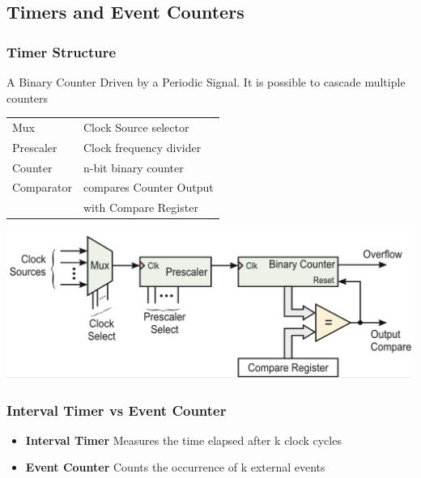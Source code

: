 \subsection{Timers and Event Counters }
\subsubsection{Timer Structure}
A Binary Counter Driven by a Periodic Signal. It is possible to cascade multiple counters\\
\vspace{1cm}
\begin{minipage}{0.5\linewidth}
	\begin{tabular}{ll}
		Mux           & Clock Source selector \\
		Prescaler     & Clock frequency divider \\
		Counter       & n-bit binary counter \\
		Comparator    & compares Counter Output\\
                      &  with Compare Register
	\end{tabular}
\end{minipage}
\begin{minipage}{0.5\linewidth}
	\hspace{-1cm}\includegraphics[width=1.2\linewidth]{images/timerstructure} 
\end{minipage}
\vspace{-1.5cm}
\subsubsection{Interval Timer vs Event Counter}
	\begin{itemize}
		\item \textbf{Interval Timer}
		\subitem Measures the time elapsed after k clock cycles
		\item \textbf{Event Counter}
		\subitem Counts the occurrence of k external events
	\end{itemize}

